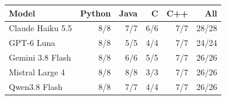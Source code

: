 \begin{tabular}{@{}lrrrrr@{}}
\toprule
Model & Python & Java & C & C++ & All \\
\midrule
Claude Haiku 5.5 & 8/8 & 7/7 & 6/6 & 7/7 & 28/28 \\
GPT-6 Luna & 8/8 & 5/5 & 4/4 & 7/7 & 24/24 \\
Gemini 3.8 Flash & 8/8 & 6/6 & 5/5 & 7/7 & 26/26 \\
Mistral Large 4 & 8/8 & 8/8 & 3/3 & 7/7 & 26/26 \\
Qwen3.8 Flash & 8/8 & 7/7 & 4/4 & 7/7 & 26/26 \\
\bottomrule
\end{tabular}
